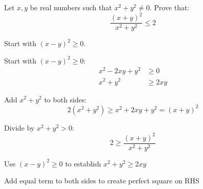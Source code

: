 \begin{problem}
Let $x, y$ be real numbers such that $x^2 + y^2 \neq 0$. Prove that:
\[
\frac{(x+y)^2}{x^2 + y^2} \le 2
\]
\end{problem}

\begin{hint}
Start with $(x-y)^2 \ge 0$.
\end{hint}

\begin{solution}
Start with $(x - y)^2 \geq 0$:
\begin{align*}
x^2 - 2xy + y^2 &\geq 0 \\
x^2 + y^2 &\geq 2xy
\end{align*}

Add $x^2 + y^2$ to both sides:
\[ 2(x^2 + y^2) \geq x^2 + 2xy + y^2 = (x + y)^2 \]

Divide by $x^2 + y^2 > 0$:
\[ 2 \geq \frac{(x + y)^2}{x^2 + y^2} \]
\end{solution}

\begin{takeaways}
\item Use $(x-y)^2 \geq 0$ to establish $x^2 + y^2 \geq 2xy$
\item Add equal term to both sides to create perfect square on RHS
\end{takeaways}
